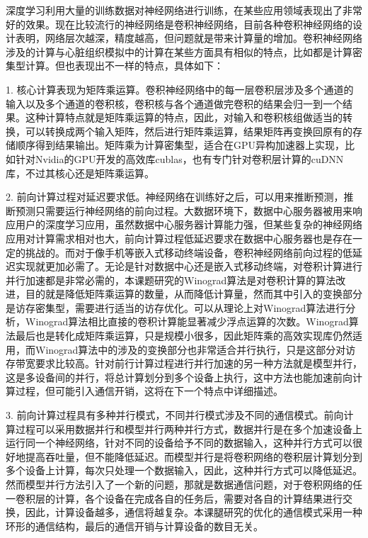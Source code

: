 深度学习利用大量的训练数据对神经网络进行训练，在某些应用领域表现出了非常好的效果。现在比较流行的神经网络是卷积神经网络，目前各种卷积神经网络的设计表明，网络层次越深，精度越高，但问题就是带来计算量的增加。卷积神经网络涉及的计算与心脏组织模拟中的计算在某些方面具有相似的特点，比如都是计算密集型计算。但也表现出不一样的特点，具体如下：
\begin{compactitem}
\item[1.]核心计算表现为矩阵乘运算。卷积神经网络中的每一层卷积层涉及多个通道的输入以及多个通道的卷积核，卷积核与各个通道做完卷积的结果会归一到一个结果。这种计算特点就是矩阵乘运算的特点，因此，对输入和卷积核组做适当的转换，可以转换成两个输入矩阵，然后进行矩阵乘运算，结果矩阵再变换回原有的存储顺序得到结果输出。矩阵乘为计算密集型，适合在GPU异构加速器上实现，比如针对Nvidia的GPU开发的高效库cublas，也有专门针对卷积层计算的cuDNN库，不过其核心还是矩阵乘运算。

\item[2.]前向计算过程对延迟要求低。神经网络在训练好之后，可以用来推断预测，推断预测只需要运行神经网络的前向过程。大数据环境下，数据中心服务器被用来响应用户的深度学习应用，虽然数据中心服务器计算能力强，但某些复杂的神经网络应用对计算需求相对也大，前向计算过程低延迟要求在数据中心服务器也是存在一定的挑战的。而对于像手机等嵌入式移动终端设备，卷积神经网络前向过程的低延迟实现就更加必需了。无论是针对数据中心还是嵌入式移动终端，对卷积计算进行并行加速都是非常必需的，本课题研究的Winograd算法是对卷积计算的算法改进，目的就是降低矩阵乘运算的数量，从而降低计算量，然而其中引入的变换部分是访存密集型，需要进行适当的访存优化。可以从理论上对Winograd算法进行分析，Winograd算法相比直接的卷积计算能显著减少浮点运算的次数。Winograd算法最后也是转化成矩阵乘运算，只是规模小很多，因此矩阵乘的高效实现库仍然适用，而Winograd算法中的涉及的变换部分也非常适合并行执行，只是这部分对访存带宽要求比较高。针对前行计算过程进行并行加速的另一种方法就是模型并行，这是多设备间的并行，将总计算划分到多个设备上执行，这中方法也能加速前向计算过程，但可能引入通信开销，这将在下一个特点中详细描述。

\item[3.]前向计算过程具有多种并行模式，不同并行模式涉及不同的通信模式。前向计算过程可以采用数据并行和模型并行两种并行方式，数据并行是在多个加速设备上运行同一个神经网络，针对不同的设备给予不同的数据输入，这种并行方式可以很好地提高吞吐量，但不能降低延迟。而模型并行是将卷积网络的卷积层计算划分到多个设备上计算，每次只处理一个数据输入，因此，这种并行方式可以降低延迟。然而模型并行方法引入了一个新的问题，那就是数据通信问题，对于卷积网络的任一卷积层的计算，各个设备在完成各自的任务后，需要对各自的计算结果进行交换，因此，计算设备越多，通信将越复杂。本课腿研究的优化的通信模式采用一种环形的通信结构，最后的通信开销与计算设备的数目无关。


\end{compactitem}
